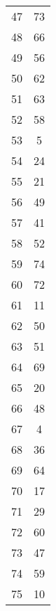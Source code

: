 \begin{table}
\begin{tabular}{c c }
47 & 73 \\
48 & 66 \\
49 & 56 \\
50 & 62 \\
51 & 63 \\
52 & 58 \\
53 & 5 \\
54 & 24 \\
55 & 21 \\
56 & 49 \\
57 & 41 \\
58 & 52 \\
59 & 74 \\
60 & 72 \\
61 & 11 \\
62 & 50 \\
63 & 51 \\
64 & 69 \\
65 & 20 \\
66 & 48 \\
67 & 4 \\
68 & 36 \\
69 & 64 \\
70 & 17 \\
71 & 29 \\
72 & 60 \\
73 & 47 \\
74 & 59 \\
75 & 10 \\
\hline
\end{tabular}
\end{table}